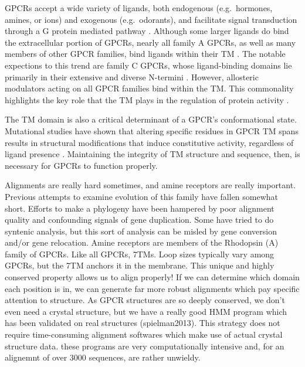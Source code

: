 \documentclass[fleqn,10pt]{wlpeerj}
\begin{document}
GPCRs accept a wide variety of ligands, both endogenous (e.g.\ hormones, amines, or ions) and exogenous (e.g.\ odorants), and facilitate signal transduction through a G protein mediated pathway \citep{Kristiansen2004,Lagerstrom2008,Rosenbaum2009}.
Although some larger ligands do bind the extracellular portion of GPCRs, nearly all family A GPCRs, as well as many members of other GPCR families, bind ligands within their TM \citep{Vaidehi2002,Kristiansen2004,Bywater2005,Surgand2006,May2006,Park2008}. The notable expections to this trend are family C GPCRs, whose ligand-binding domains lie primarily in their extensive and diverse N-termini \citep{May2006,Park2008,Lagerstrom2008}. However, allosteric  modulators acting on all GPCR families bind within the TM. This commonality highlights the key role that the TM plays in the regulation of protein activity \citep{May2006,Lagerstrom2008}.

The TM domain is also a critical determinant of a GPCR's conformational state. Mutational studies have shown that altering specific residues in GPCR TM spans results in structural modifications that induce constitutive activity, regardless of ligand presence \citep{Spalding1998,Lu2000}. Maintaining the integrity of TM structure and sequence, then, is necessary for GPCRs to function properly.




Alignments are really hard sometimes, and amine receptors are really important. Previous attempts to examine evolution of this family have fallen somewhat short. Efforts to make a phylogeny have been hampered by poor alignment quality and confounding signals of gene duplication. Some have tried to do syntenic analysis, but this sort of analysis can be misled by gene conversion and/or gene relocation. 
Amine receptors are members of the Rhodopsin (A) family of GPCRs. Like all GPCRs, 7TMs. Loop sizes typically vary among GPCRs, but the 7TM anchors it in the membrane. This unique and highly conserved property allows us to align properly! If we can determine which domain each position is in, we can generate far more robust alignments which pay specific attention to structure. As GPCR structures are so deeply conserved, we don't even need a crystal structure, but we have a really good HMM program which has been validated on real structures (spielman2013). This strategy does not require time-consuming alignment softwares which make use of actual crystal structure data. these programs are very computationally intensive and, for an alignemnt of over 3000 sequences, are rather unwieldy. 
\end{document}
